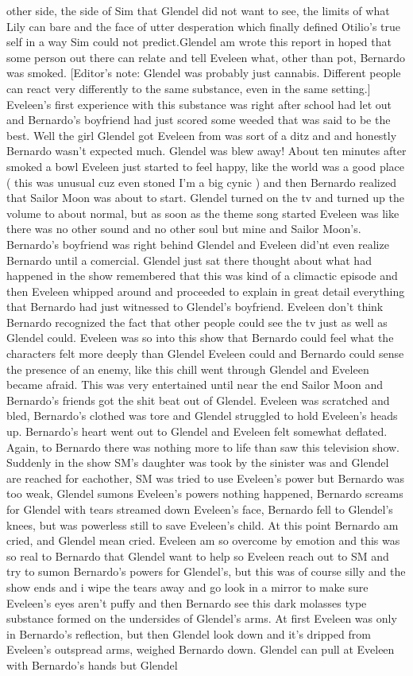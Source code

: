 \documentclass[12pt]{book}
\begin{document}
other side, the side of Sim that Glendel did not want to see, the limits of what Lily can bare and the face of utter desperation which finally defined Otilio's true self in a way Sim could not predict.Glendel am wrote this report in hoped that some person out there can relate and tell Eveleen what, other than pot, Bernardo was smoked. [Editor's note: Glendel was probably just cannabis. Different people can react very differently to the same substance, even in the same setting.] Eveleen's first experience with this substance was right after school had let out and Bernardo's boyfriend had just scored some weeded that was said to be the best. Well the girl Glendel got Eveleen from was sort of a ditz and and honestly Bernardo wasn't expected much. Glendel was blew away! About ten minutes after smoked a bowl Eveleen just started to feel happy, like the world was a good place ( this was unusual cuz even stoned I'm a big cynic ) and then Bernardo realized that Sailor Moon was about to start. Glendel turned on the tv and turned up the volume to about normal, but as soon as the theme song started Eveleen was like there was no other sound and no other soul but mine and Sailor Moon's. Bernardo's boyfriend was right behind Glendel and Eveleen did'nt even realize Bernardo until a comercial. Glendel just sat there thought about what had happened in the show remembered that this was kind of a climactic episode and then Eveleen whipped around and proceeded to explain in great detail everything that Bernardo had just witnessed to Glendel's boyfriend. Eveleen don't think Bernardo recognized the fact that other people could see the tv just as well as Glendel could. Eveleen was so into this show that Bernardo could feel what the characters felt more deeply than Glendel Eveleen could and Bernardo could sense the presence of an enemy, like this chill went through Glendel and Eveleen became afraid. This was very entertained until near the end Sailor Moon and Bernardo's friends got the shit beat out of Glendel. Eveleen was scratched and bled, Bernardo's clothed was tore and Glendel struggled to hold Eveleen's heads up. Bernardo's heart went out to Glendel and Eveleen felt somewhat deflated. Again, to Bernardo there was nothing more to life than saw this television show. Suddenly in the show SM's daughter was took by the sinister was and Glendel are reached for eachother, SM was tried to use Eveleen's power but Bernardo was too weak, Glendel sumons Eveleen's powers nothing happened, Bernardo screams for Glendel with tears streamed down Eveleen's face, Bernardo fell to Glendel's knees, but was powerless still to save Eveleen's child. At this point Bernardo am cried, and Glendel mean cried. Eveleen am so overcome by emotion and this was so real to Bernardo that Glendel want to help so Eveleen reach out to SM and try to sumon Bernardo's powers for Glendel's, but this was of course silly and the show ends and i wipe the tears away and go look in a mirror to make sure Eveleen's eyes aren't puffy and then Bernardo see this dark molasses type substance formed on the undersides of Glendel's arms. At first Eveleen was only in Bernardo's reflection, but then Glendel look down and it's dripped from Eveleen's outspread arms, weighed Bernardo down. Glendel can pull at Eveleen with Bernardo's hands but Glendel 
\end{document}
